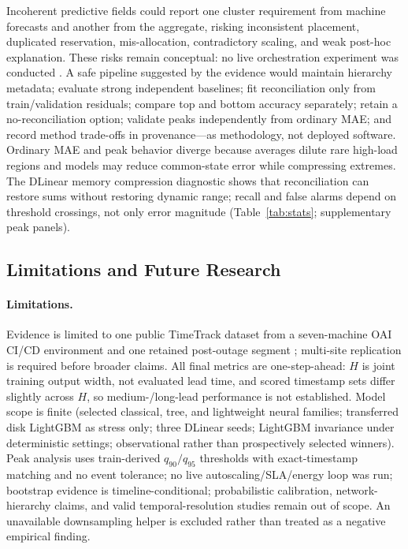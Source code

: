 \documentclass[a4paper,fleqn]{cas-dc}
\begin{document}
Incoherent predictive fields could report one cluster requirement from machine
forecasts and another from the aggregate, risking inconsistent placement,
duplicated reservation, mis-allocation, contradictory scaling, and weak
post-hoc explanation.
These risks remain conceptual: no live orchestration experiment was conducted
\cite{meliani2026zerotouch}.
A safe pipeline suggested by the evidence would maintain hierarchy metadata;
evaluate strong independent baselines; fit reconciliation only from
train/validation residuals; compare top and bottom accuracy separately; retain a
no-reconciliation option; validate peaks independently from ordinary {MAE}; and
record method trade-offs in provenance---as methodology, not deployed software.
Ordinary {MAE} and peak behavior diverge because averages dilute rare high-load
regions and models may reduce common-state error while compressing extremes.
The DLinear memory compression diagnostic shows that reconciliation can restore
sums without restoring dynamic range; recall and false alarms depend on threshold
crossings, not only error magnitude
(Table~\ref{tab:stats}; supplementary peak panels).

\subsection{Limitations and Future Research}
\label{sec:disc-limits}
\paragraph{Limitations.}
Evidence is limited to one public TimeTrack dataset from a seven-machine {OAI}
{CI}/{CD} environment and one retained post-outage segment
\cite{meliani2025timetrack,meliani2025timetrackkaggle}; multi-site replication is
required before broader claims.
All final metrics are one-step-ahead: $H$ is joint training output width, not
evaluated lead time, and scored timestamp sets differ slightly across $H$, so
medium-/long-lead performance is not established.
Model scope is finite (selected classical, tree, and lightweight neural
families; transferred disk LightGBM as stress only; three DLinear seeds;
LightGBM invariance under deterministic settings; observational rather than
prospectively selected winners).
Peak analysis uses train-derived $q_{90}/q_{95}$ thresholds with exact-timestamp
matching and no event tolerance; no live autoscaling/{SLA}/energy loop was run;
bootstrap evidence is timeline-conditional; probabilistic calibration,
network-hierarchy claims, and valid temporal-resolution studies remain out of
scope.
An unavailable downsampling helper is excluded rather than treated as a negative
empirical finding.
\end{document}
